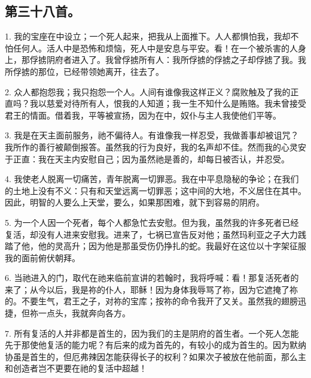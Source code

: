 
\subsection{第三十八首。}

1. 我的宝座在中设立；一个死人起来，把我从上面推下。人人都惧怕我，我却不怕任何人。活人中是恐怖和烦恼，死人中是安息与平安。看！在一个被杀害的人身上，那俘掳阴府者进入了。我曾俘掳所有人：我所俘掳的俘掳之子却俘掳了我。我所俘掳的那位，已经带领她离开，往去了。\par

2. 众人都抱怨我；我只抱怨一个人。人间有谁像我这样正义？腐败触及了我的正直吗？我以慈爱对待所有人，恨我的人知道；我一生不知什么是贿赂。我未曾接受君王的情面。借着我，平等被宣扬，因为在中，奴仆与主人我使他们平等。\par

3. 我是在天主面前服务，祂不偏待人。有谁像我一样忍受，我做善事却被诅咒？我所作的善行被颠倒报答。虽然我的行为良好，我的名声却不佳。然而我的心灵安于正直：我在天主内安慰自己；因为虽然祂是善的，却每日被否认，并忍受。\par

4. 我使老人脱离一切痛苦，青年脱离一切罪恶。我在中平息隐秘的争论；在我们的土地上没有不义：只有和天堂远离一切罪恶；这中间的大地，不义居住在其中。因此，明智的人要么上天堂，要么，如果那困难，就下到容易的阴府。\par

5. 为一个人因一个死者，每个人都急忙去安慰。但为我，虽然我的许多死者已经复活，却没有人进来安慰我。进来了，七祸已宣告反对他；虽然玛利亚之子大力践踏了他，他的灵高升；因为他是那虽受伤仍挣扎的蛇。我最好在这位以十字架征服我的面前俯伏朝拜。\par

6. 当祂进入的门，取代在祂来临前宣讲的若翰时，我将呼喊：看！那复活死者的来了；从今以后，我是祢的仆人，耶稣！因为身体我辱骂了祢，因为它遮掩了祢的。不要生气，君王之子，对祢的宝库；按祢的命令我开了又关。虽然我的翅膀迅捷，但祢一点头，我就奔向各方。\par

7. 所有复活的人并非都是首生的，因为我们的主是阴府的首生者。一个死人怎能先于那使他复活的能力呢？有后来的成为首先的，有较小的成为首生的。因为默纳协虽是首生的，但厄弗辣因怎能获得长子的权利？如果次子被放在他前面，那么主和创造者岂不更要在祂的复活中超越！\par

